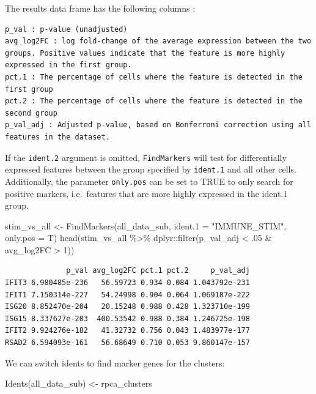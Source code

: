 \documentclass[
  letterpaper,
  DIV=11,
  numbers=noendperiod]{scrreprt}
\newenvironment{Shaded}{\begin{snugshade}}{\end{snugshade}}
\newcommand{\AttributeTok}[1]{\textcolor[rgb]{0.40,0.45,0.13}{#1}}
\newcommand{\DecValTok}[1]{\textcolor[rgb]{0.68,0.00,0.00}{#1}}
\newcommand{\FunctionTok}[1]{\textcolor[rgb]{0.28,0.35,0.67}{#1}}
\newcommand{\NormalTok}[1]{\textcolor[rgb]{0.00,0.23,0.31}{#1}}
\newcommand{\OtherTok}[1]{\textcolor[rgb]{0.00,0.23,0.31}{#1}}
\newcommand{\SpecialCharTok}[1]{\textcolor[rgb]{0.37,0.37,0.37}{#1}}
\newcommand{\StringTok}[1]{\textcolor[rgb]{0.13,0.47,0.30}{#1}}
\begin{document}
The results data frame has the following columns :

\begin{verbatim}
p_val : p-value (unadjusted)
avg_log2FC : log fold-change of the average expression between the two groups. Positive values indicate that the feature is more highly expressed in the first group.
pct.1 : The percentage of cells where the feature is detected in the first group
pct.2 : The percentage of cells where the feature is detected in the second group
p_val_adj : Adjusted p-value, based on Bonferroni correction using all features in the dataset.
\end{verbatim}

If the \texttt{ident.2} argument is omitted, \texttt{FindMarkers} will
test for differentially expressed features between the group specified
by \texttt{ident.1} and all other cells. Additionally, the parameter
\texttt{only.pos} can be set to TRUE to only search for positive
markers, i.e.~features that are more highly expressed in the ident.1
group.

\begin{Shaded}
\begin{Highlighting}[]
\NormalTok{stim\_vs\_all }\OtherTok{\textless{}{-}} \FunctionTok{FindMarkers}\NormalTok{(all\_data\_sub, }\AttributeTok{ident.1 =} \StringTok{"IMMUNE\_STIM"}\NormalTok{, }\AttributeTok{only.pos =}\NormalTok{ T)}
\FunctionTok{head}\NormalTok{(stim\_vs\_all }\SpecialCharTok{\%\textgreater{}\%}\NormalTok{ dplyr}\SpecialCharTok{::}\FunctionTok{filter}\NormalTok{(p\_val\_adj }\SpecialCharTok{\textless{}}\NormalTok{ .}\DecValTok{05} \SpecialCharTok{\&}\NormalTok{ avg\_log2FC }\SpecialCharTok{\textgreater{}} \DecValTok{1}\NormalTok{))}
\end{Highlighting}
\end{Shaded}

\begin{verbatim}
              p_val avg_log2FC pct.1 pct.2     p_val_adj
IFIT3 6.980485e-236   56.59723 0.934 0.084 1.043792e-231
IFIT1 7.150314e-227   54.24998 0.904 0.064 1.069187e-222
ISG20 8.852470e-204   20.15248 0.988 0.428 1.323710e-199
ISG15 8.337627e-203  400.53542 0.988 0.384 1.246725e-198
IFIT2 9.924276e-182   41.32732 0.756 0.043 1.483977e-177
RSAD2 6.594093e-161   56.68649 0.710 0.053 9.860147e-157
\end{verbatim}

We can switch idents to find marker genes for the clusters:

\begin{Shaded}
\begin{Highlighting}[]
\FunctionTok{Idents}\NormalTok{(all\_data\_sub) }\OtherTok{\textless{}{-}} \StringTok{\textquotesingle{}rpca\_clusters\textquotesingle{}}
\end{Highlighting}
\end{Shaded}
\end{document}
